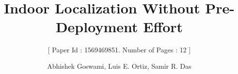 \documentclass{sig-alternate-10pt}
\begin{document}
%

\title{Indoor Localization Without Pre-Deployment Effort}
\subtitle{[  Paper Id : 1569469851. Number of Pages : 12 ]}
%
%
%
%
%

%
\author{
%
%
\alignauthor
Abhishek Goswami, Luis E. Ortiz, Samir R. Das\\
       \\
       \\
}
\end{document}
